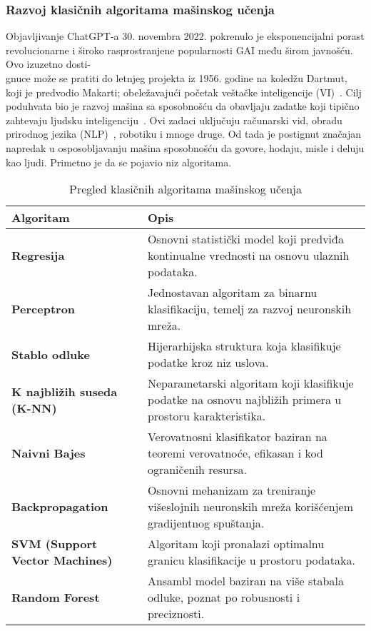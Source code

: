 \subsubsection{Razvoj klasičnih algoritama mašinskog učenja}
Objavljivanje ChatGPT-a 30. novembra 2022. pokrenulo je eksponencijalni porast revolucionarne i široko rasprostranjene popularnosti GAI među širom javnošću. Ovo izuzetno dosti-\\gnuce  može se pratiti do letnjeg projekta iz 1956. godine na koledžu Dartmut, koji je predvodio Makarti; obeležavajući početak veštačke inteligencije (VI)~\cite{ref3}. Cilj poduhvata bio je razvoj mašina sa sposobnošću da obavljaju zadatke koji tipično zahtevaju ljudsku inteligenciju~\cite{ref4,ref5,ref6,ref7,ref8}. Ovi zadaci uključuju računarski vid, obradu prirodnog jezika (NLP)~\cite{ref9,ref10}, robotiku i mnoge druge. Od tada je postignut značajan napredak u osposobljavanju mašina sposobnošću da govore, hodaju, misle i deluju kao ljudi. Primetno je da se pojavio niz algoritama.

\addto\captionsenglish{\renewcommand{\tablename}{Tabela}}

\addto\captionsenglish{\renewcommand{\tablename}{Tabela}}

\begin{table}[h!]
\centering
\renewcommand{\arraystretch}{1.4}
\setlength{\tabcolsep}{8pt}
\begin{tabularx}{\textwidth}{>{\bfseries}l X}
\rowcolor{apstrakt_color!30}
\textbf{Algoritam} & \textbf{Opis} \\
\hline
Regresija & Osnovni statistički model koji predviđa kontinualne vrednosti na osnovu ulaznih podataka. \\
\hline
Perceptron & Jednostavan algoritam za binarnu klasifikaciju, temelj za razvoj neuronskih mreža. \\
\hline
Stablo odluke & Hijerarhijska struktura koja klasifikuje podatke kroz niz uslova. \\
\hline
K najbližih suseda (K-NN) & Neparametarski algoritam koji klasifikuje podatke na osnovu najbližih primera u prostoru karakteristika. \\
\hline
Naivni Bajes & Verovatnosni klasifikator baziran na teoremi verovatnoće, efikasan i kod ograničenih resursa. \\
\hline
Backpropagation & Osnovni mehanizam za treniranje višeslojnih neuronskih mreža korišćenjem gradijentnog spuštanja. \\
\hline
SVM (Support Vector Machines) & Algoritam koji pronalazi optimalnu granicu klasifikacije u prostoru podataka. \\
\hline
Random Forest & Ansambl model baziran na više stabala odluke, poznat po robusnosti i preciznosti. \\
\hline
\end{tabularx}
\caption{Pregled klasičnih algoritama mašinskog učenja}
\end{table}

